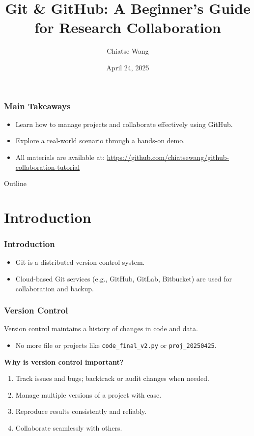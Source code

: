 \documentclass[12pt]{beamer}
\title[Git Tutorial]{Git \& GitHub: A Beginner's Guide for Research Collaboration}
\author{Chiatse Wang}
\institute[ISS AS]{Institute of Statistical Science, Academia Sinica}
\date{April 24, 2025}
\begin{document}
\begin{frame}
  \titlepage
\end{frame}

\begin{frame}
  \frametitle{Main Takeaways}
  \begin{itemize}
    \setlength\itemsep{1em}
    \item Learn how to manage projects and collaborate effectively using GitHub.
    \item Explore a real-world scenario through a hands-on demo.
    \item All materials are available at: \url{https://github.com/chiatsewang/github-collaboration-tutorial}
  \end{itemize}
\end{frame}

\begin{frame}{Outline}
  \tableofcontents
\end{frame}

\section{Introduction}

\begin{frame}
  \frametitle{Introduction}
  \begin{itemize}
    \setlength\itemsep{1em}
    \item Git is a distributed version control system.
    \item Cloud-based Git services (e.g., GitHub, GitLab, Bitbucket) are used for collaboration and backup.
  \end{itemize}
\end{frame}

\begin{frame}
  \frametitle{Version Control}

  Version control maintains a history of changes in code and data.
  \begin{itemize}
    \setlength\itemsep{1em}
    \item No more file or projects like \texttt{code\_final\_v2.py} or \texttt{proj\_20250425}.
  \end{itemize}
  
  \vspace{1em}
  \textbf{Why is version control important?}
  \vspace{1em}

  \begin{enumerate}
    \setlength\itemsep{1em}
    \item Track issues and bugs; backtrack or audit changes when needed.
    \item Manage multiple versions of a project with ease.
    \item Reproduce results consistently and reliably.
    \item Collaborate seamlessly with others.
  \end{enumerate}
\end{frame}
\end{document}

